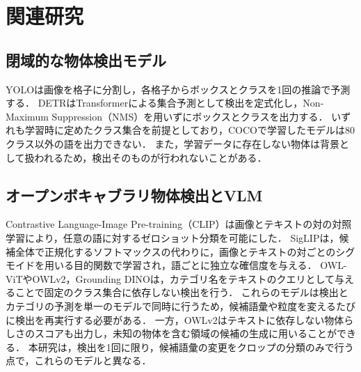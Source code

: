 \section{関連研究}
\subsection{閉域的な物体検出モデル}
YOLO\cite{ref_YOLO}は画像を格子に分割し，各格子からボックスとクラスを1回の推論で予測する．
DETR\cite{ref_DETR}はTransformerによる集合予測として検出を定式化し，Non-Maximum Suppression（NMS）を用いずにボックスとクラスを出力する．
いずれも学習時に定めたクラス集合を前提としており，COCO\cite{ref_COCO}で学習したモデルは80クラス以外の語を出力できない．
また，学習データに存在しない物体は背景として扱われるため，検出そのものが行われないことがある．

\subsection{オープンボキャブラリ物体検出とVLM}
Contrastive Language-Image Pre-training（CLIP）\cite{ref_CLIP}は画像とテキストの対の対照学習により，任意の語に対するゼロショット分類を可能にした．
SigLIP\cite{ref_SigLIP}は，候補全体で正規化するソフトマックスの代わりに，画像とテキストの対ごとのシグモイドを用いる目的関数で学習され，語ごとに独立な確信度を与える．
OWL-ViT\cite{ref_OWLViT}やOWLv2\cite{ref_OWLv2}，Grounding DINO\cite{ref_GroundingDINO}は，カテゴリ名をテキストのクエリとして与えることで固定のクラス集合に依存しない検出を行う．
これらのモデルは検出とカテゴリの予測を単一のモデルで同時に行うため，候補語彙や粒度を変えるたびに検出を再実行する必要がある．
一方，OWLv2はテキストに依存しない物体らしさのスコアも出力し，未知の物体を含む領域の候補の生成に用いることができる．
本研究は，検出を1回に限り，候補語彙の変更をクロップの分類のみで行う点で，これらのモデルと異なる．
